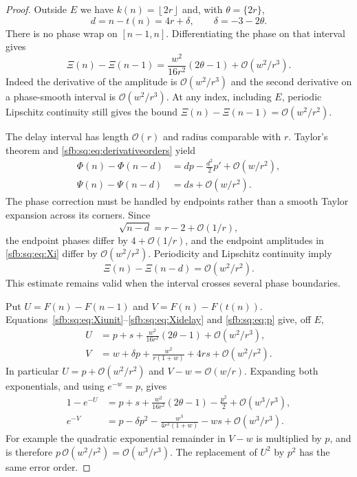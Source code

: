 \documentclass[11pt]{article}
\theoremstyle{remark}\newtheorem{remark}[theorem]{Remark}
\newcommand{\OO}{\mathcal O}
\newcommand{\floor}[1]{\left\lfloor #1\right\rfloor}
\begin{document}
\begin{proof}
Outside $E$ we have $k(n)=\floor{2r}$ and, with $\theta=\{2r\}$,
\begin{equation}\label{sfb:sq:eq:delta}
 d=n-t(n)=4r+\delta,\qquad\delta=-3-2\theta.
\end{equation}
There is no phase wrap on $[n-1,n]$. Differentiating the phase on that interval gives
\begin{equation}\label{sfb:sq:eq:Xiunit}
 \Xi(n)-\Xi(n-1)
 =\frac{w^2}{16r^2}(2\theta-1)+\OO(w^2/r^3).
\end{equation}
Indeed the derivative of the amplitude is $\OO(w^2/r^3)$ and the second derivative on a phase-smooth interval is $\OO(w^2/r^3)$. At any index, including $E$, periodic Lipschitz continuity still gives the bound $\Xi(n)-\Xi(n-1)=\OO(w^2/r^2)$.

The delay interval has length $\OO(r)$ and radius comparable with $r$. Taylor's theorem and \eqref{sfb:sq:eq:derivativeorders} yield
\begin{align}
 \Phi(n)-\Phi(n-d)&=dp-\frac{d^2}{2}p'+\OO(w/r^2),\label{sfb:sq:eq:Phidelay}\\
 \Psi(n)-\Psi(n-d)&=ds+\OO(w/r^2).\label{sfb:sq:eq:Psidelay}
\end{align}
The phase correction must be handled by endpoints rather than a smooth Taylor expansion across its corners. Since
\[
 \sqrt{n-d}=r-2+\OO(1/r),
\]
the endpoint phases differ by $4+\OO(1/r)$, and the endpoint amplitudes in \eqref{sfb:sq:eq:Xi} differ by $\OO(w^2/r^2)$. Periodicity and Lipschitz continuity imply
\begin{equation}\label{sfb:sq:eq:Xidelay}
 \Xi(n)-\Xi(n-d)=\OO(w^2/r^2).
\end{equation}
This estimate remains valid when the interval crosses several phase boundaries.

Put $U=F(n)-F(n-1)$ and $V=F(n)-F(t(n))$. Equations~\eqref{sfb:sq:eq:Xiunit}--\eqref{sfb:sq:eq:Xidelay} and \eqref{sfb:sq:eq:p} give, off $E$,
\begin{align}
 U&=p+s+\frac{w^2}{16r^2}(2\theta-1)+\OO(w^2/r^3),\label{sfb:sq:eq:U}\\
 V&=w+\delta p+\frac{w^2}{r(1+w)}+4rs+\OO(w^2/r^2).\label{sfb:sq:eq:V}
\end{align}
In particular $U=p+\OO(w^2/r^2)$ and $V-w=\OO(w/r)$. Expanding both exponentials, and using $e^{-w}=p$, gives
\begin{align}
 1-e^{-U}
 &=p+s+\frac{w^2}{16r^2}(2\theta-1)-\frac{p^2}{2}
   +\OO(w^3/r^3),\label{sfb:sq:eq:expU}\\
 e^{-V}
 &=p-\delta p^2-\frac{w^3}{4r^2(1+w)}-ws
   +\OO(w^3/r^3).\label{sfb:sq:eq:expV}
\end{align}
For example the quadratic exponential remainder in $V-w$ is multiplied by $p$, and is therefore $p\,\OO(w^2/r^2)=\OO(w^3/r^3)$. The replacement of $U^2$ by $p^2$ has the same error order.


\end{proof}
\end{document}
